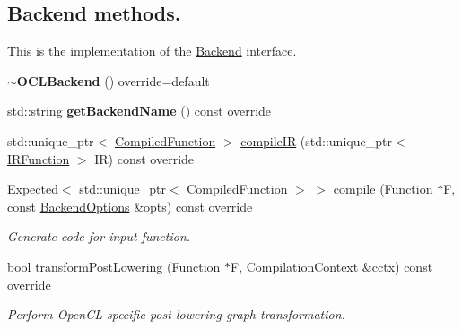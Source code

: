 \subsection*{Backend methods.}
\label{_amgrp74a5605ee0c2530d0af87631bd615b01}%
 This is the implementation of the \hyperlink{classglow_1_1_backend}{Backend} interface. \begin{DoxyCompactItemize}
\item 
\mbox{\label{classglow_1_1_o_c_l_backend_ac738635aa30f9a159b60d4c196cb9768}} 
{\bfseries $\sim$\+O\+C\+L\+Backend} () override=default
\item 
\mbox{\label{classglow_1_1_o_c_l_backend_ad2d434bac720fd9d197fdfe782166165}} 
std\+::string {\bfseries get\+Backend\+Name} () const override
\item 
std\+::unique\+\_\+ptr$<$ \hyperlink{classglow_1_1_compiled_function}{Compiled\+Function} $>$ \hyperlink{classglow_1_1_o_c_l_backend_adca7327cc92dcc26d12cac5a7a474e94}{compile\+IR} (std\+::unique\+\_\+ptr$<$ \hyperlink{classglow_1_1_i_r_function}{I\+R\+Function} $>$ IR) const override
\item 
\hyperlink{classglow_1_1detail_1_1_glow_expected}{Expected}$<$ std\+::unique\+\_\+ptr$<$ \hyperlink{classglow_1_1_compiled_function}{Compiled\+Function} $>$ $>$ \hyperlink{classglow_1_1_o_c_l_backend_a0a058f7b6eac1efea438e171e56d9c6e}{compile} (\hyperlink{classglow_1_1_function}{Function} $\ast$F, const \hyperlink{structglow_1_1_backend_options}{Backend\+Options} \&opts) const override
\begin{DoxyCompactList}\small\item\em Generate code for input function. \end{DoxyCompactList}\item 
\mbox{\label{classglow_1_1_o_c_l_backend_a46ac2d50ece0ebe47953c854b1b62102}} 
bool \hyperlink{classglow_1_1_o_c_l_backend_a46ac2d50ece0ebe47953c854b1b62102}{transform\+Post\+Lowering} (\hyperlink{classglow_1_1_function}{Function} $\ast$F, \hyperlink{structglow_1_1_compilation_context}{Compilation\+Context} \&cctx) const override
\begin{DoxyCompactList}\small\item\em Perform Open\+CL specific post-\/lowering graph transformation. \end{DoxyCompactList}\item 

\end{DoxyCompactItemize}
